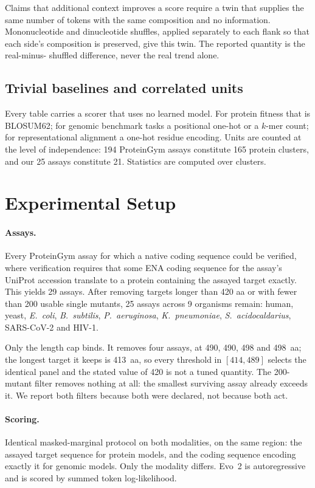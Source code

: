 \documentclass[11pt]{article}
\begin{document}
Claims that additional context improves a score require a twin that supplies the
same number of tokens with the same composition and no information. Mononucleotide
and dinucleotide shuffles, applied separately to each flank so that each side's
composition is preserved, give this twin. The reported quantity is the real-minus-
shuffled difference, never the real trend alone.

\subsection{Trivial baselines and correlated units}
\label{sec:trivial}

Every table carries a scorer that uses no learned model. For protein fitness that
is BLOSUM62; for genomic benchmark tasks a positional one-hot or a $k$-mer count;
for representational alignment a one-hot residue encoding. Units are counted at the
level of independence: 194 ProteinGym assays constitute 165 protein clusters, and
our 25 assays constitute 21. Statistics are computed over clusters.

\section{Experimental Setup}

\paragraph{Assays.} Every ProteinGym assay for which a native coding sequence could
be verified, where verification requires that some ENA coding sequence for the
assay's UniProt accession translate to a protein containing the assayed target
exactly. This yields 29 assays. After removing targets longer than 420 aa or with
fewer than 200 usable single mutants, 25 assays across 9 organisms remain: human,
yeast, \textit{E.\ coli}, \textit{B.\ subtilis}, \textit{P.\ aeruginosa},
\textit{K.\ pneumoniae}, \textit{S.\ acidocaldarius}, SARS-CoV-2 and HIV-1.

Only the length cap binds. It removes four assays, at 490, 490, 498 and 498~aa;
the longest target it keeps is 413~aa, so every threshold in $[414, 489]$ selects
the identical panel and the stated value of 420 is not a tuned quantity. The
200-mutant filter removes nothing at all: the smallest surviving assay already
exceeds it. We report both filters because both were declared, not because both
act.

\paragraph{Scoring.} Identical masked-marginal protocol on both modalities, on the
same region: the assayed target sequence for protein models, and the coding
sequence encoding exactly it for genomic models. Only the modality differs. Evo~2
is autoregressive and is scored by summed token log-likelihood.
\end{document}
